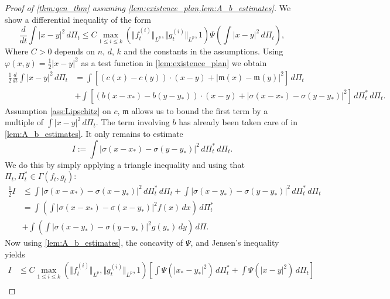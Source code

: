 \documentclass[10pt,oneside]{amsart}
\numberwithin{equation}{section}
\numberwithin{definition}{section}
\numberwithin{theorem}{section}
\numberwithin{lemma}{section}
\begin{document}
\begin{proof}[Proof of \cref{thm:gen_thm} assuming \cref{lem:existence_plan,lem:A_b_estimates}]
  We show a differential inequality of the form
  \begin{equation*}
    \frac{d}{dt}\int|x-y|^{2}\,d\Pi_{t}\leq C\max_{1\leq i \leq k}( \Vert f_{t}^{(i)}\Vert _{L^{p}},\Vert g_{t}^{(i)}\Vert _{L^{p}},1) \Psi\left(\int|x-y|^{2}\,d\Pi_{t}\right),
  \end{equation*}
  Where $C>0$ depends on $n$, $d$, $k$ and the constants in the assumptions. Using $\varphi(x,y)=\frac{1}{2}|x-y|^2$ as a test function in \cref{lem:existence_plan} we obtain
  \begin{align*}
    \frac{1}{2}\frac{d}{dt}\int|x-y|^{2}\,d\Pi_{t} &
    =\int\left[\left(c(x)-c(y)\right)\cdot(x-y)+\left|\mathfrak m(x)-\mathfrak m(y)\right|^{2}\right]\,d\Pi_{t}	\\
    & +\int\left[\left(b(x-x_{*})-b(y-y_{*})\right)\cdot(x-y)+\left|\sigma(x-x_{*})-\sigma(y-y_{*})\right|^{2}\right]\,d\Pi_{t}^{*}\,d\Pi_{t}.
  \end{align*}
  Assumption \ref{ass:Lipschitz} on $c$, $\mathfrak m$ allows us to bound the first term by a multiple of $\int|x-y|^{2}\,d\Pi_{t}$. The term involving $b$ has already been taken care of in \cref{lem:A_b_estimates}. It only remains to estimate
  \begin{equation*}
    I:=\int\left|\sigma(x-x_{*})-\sigma(y-y_{*})\right|^{2}\,d\Pi_{t}^{*}\,d\Pi_{t}.
  \end{equation*}
  We do this by simply applying a triangle inequality and using that $\Pi_t,\Pi_t^*\in \Gamma(f_t,g_t)$:
  \begin{align*}
    \frac{1}{2}I &\leq  \int\left|\sigma(x-x_{*})-\sigma(x-y_{*})\right|^{2}\,d\Pi_{t}^{*}\,d\Pi_{t}
    + \int\left|\sigma(x-y_{*})-\sigma(y-y_{*})\right|^{2}\,d\Pi_{t}^{*}\,d\Pi_{t}\\
    & =\int\left(\int\left|\sigma(x-x_{*})-\sigma(x-y_{*})\right|^{2}f(x)\,dx\right)\,d\Pi_{t}^{*}\\
    & +\int\left(\int\left|\sigma(x-y_{*})-\sigma(y-y_{*})\right|^{2}g(y_{*})\,dy\right)\,d\Pi.
  \end{align*}
  Now using \cref{lem:A_b_estimates}, the concavity of $\Psi$, and Jensen's inequality yields
  \begin{align*}
    I & \leq C\max_{1\leq i \leq k}(\Vert f_{t}^{(i)}\Vert _{L^{p}},\Vert g_{t}^{(i)}\Vert _{L^{p}},1)
    \left[\int\Psi(|x_{*}-y_{*}|^{2})\,d\Pi_{t}^{*}+\int\Psi(|x-y|^{2})\,d\Pi_{t}\right]\\

\end{align*}
\end{proof}
\end{document}
